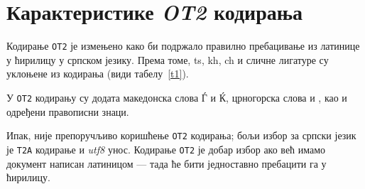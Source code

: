 \documentclass{article}
\begin{document}
	\section{Карактеристике \textit{OT2} кодирања}
	
	Кодирање \texttt{OT2} је измењено како би подржало правилно пребацивање из латинице у ћирилицу у српском језику. Према томе, \textsf{ts}, \textsf{kh}, \textsf{ch} и сличне лигатуре су уклоњене из кодирања (види табелу~\ref{t1}). 
	
	У \texttt{OT2} кодирању су додата македонска слова Ѓ и Ќ, црногорска слова \CYRSJE{} и \CYRZJE, као и одређени правописни знаци.
	
	Ипак, није препоручљиво коришћење \texttt{OT2} кодирања; бољи избор за српски језик је \texttt{T2A} кодирање и \textit{utf8} унос. Кодирање \texttt{OT2} је добар избор ако већ имамо документ написан латиницом — тада ће бити једноставно пребацити га у ћирилицу.
	
\end{document}
